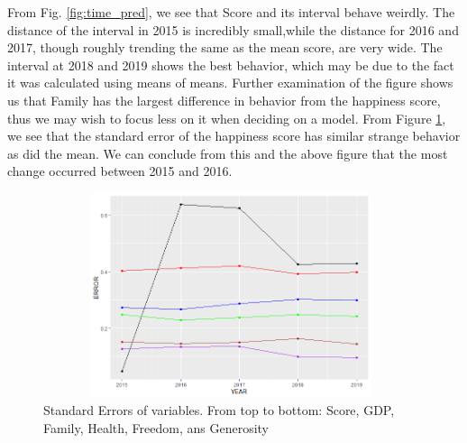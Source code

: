 \documentclass{article}
\begin{document}
From Fig. \ref{fig:time_pred}, we see that Score and its interval behave weirdly. The distance of the interval in 2015 is incredibly small,while the distance for 2016 and 2017, though roughly trending the same as the mean score, are very wide. The interval at 2018 and 2019 shows the best behavior, which may be due to the fact it was calculated using means of means. Further examination of the figure shows us that Family has the largest difference in behavior from the happiness score, thus we may wish to focus less on it when deciding on a model. From Figure \ref{fig:ERR}, we see that the standard error of the happiness score has similar strange behavior as did the mean. We can conclude from this and the above figure that the most change occurred between 2015 and 2016.

\begin{figure}[h]
    \centering
    \includegraphics[width=11cm,height=6cm]{Regional_Mean/RplotB.png}
    \caption{Standard Errors of variables. From top to bottom: Score, GDP, Family, Health, Freedom, ans Generosity}
    \label{fig:ERR}
\end{figure}

\newpage
\end{document}
